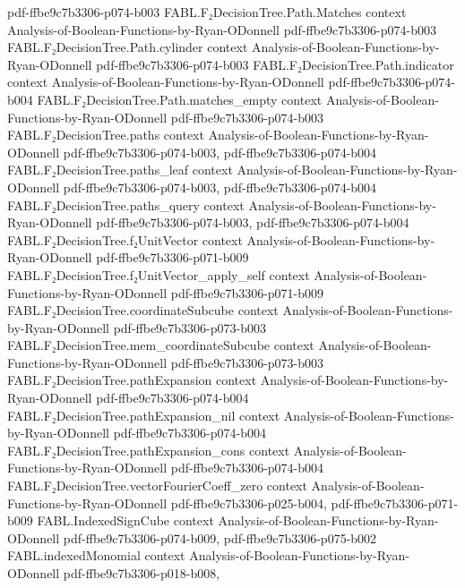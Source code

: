 \begin{theorem}
  {pdf-ffbe9c7b3306-p074-b003}
\proofstep
  {FABL.F₂DecisionTree.Path.Matches}
  {context}
  {Analysis-of-Boolean-Functions-by-Ryan-ODonnell}
  {pdf-ffbe9c7b3306-p074-b003}
\proofstep
  {FABL.F₂DecisionTree.Path.cylinder}
  {context}
  {Analysis-of-Boolean-Functions-by-Ryan-ODonnell}
  {pdf-ffbe9c7b3306-p074-b003}
\proofstep
  {FABL.F₂DecisionTree.Path.indicator}
  {context}
  {Analysis-of-Boolean-Functions-by-Ryan-ODonnell}
  {pdf-ffbe9c7b3306-p074-b004}
\proofstep
  {FABL.F₂DecisionTree.Path.matches_empty}
  {context}
  {Analysis-of-Boolean-Functions-by-Ryan-ODonnell}
  {pdf-ffbe9c7b3306-p074-b003}
\proofstep
  {FABL.F₂DecisionTree.paths}
  {context}
  {Analysis-of-Boolean-Functions-by-Ryan-ODonnell}
  {pdf-ffbe9c7b3306-p074-b003,
    pdf-ffbe9c7b3306-p074-b004}
\proofstep
  {FABL.F₂DecisionTree.paths_leaf}
  {context}
  {Analysis-of-Boolean-Functions-by-Ryan-ODonnell}
  {pdf-ffbe9c7b3306-p074-b003,
    pdf-ffbe9c7b3306-p074-b004}
\proofstep
  {FABL.F₂DecisionTree.paths_query}
  {context}
  {Analysis-of-Boolean-Functions-by-Ryan-ODonnell}
  {pdf-ffbe9c7b3306-p074-b003,
    pdf-ffbe9c7b3306-p074-b004}
\proofstep
  {FABL.F₂DecisionTree.f₂UnitVector}
  {context}
  {Analysis-of-Boolean-Functions-by-Ryan-ODonnell}
  {pdf-ffbe9c7b3306-p071-b009}
\proofstep
  {FABL.F₂DecisionTree.f₂UnitVector_apply_self}
  {context}
  {Analysis-of-Boolean-Functions-by-Ryan-ODonnell}
  {pdf-ffbe9c7b3306-p071-b009}
\proofstep
  {FABL.F₂DecisionTree.coordinateSubcube}
  {context}
  {Analysis-of-Boolean-Functions-by-Ryan-ODonnell}
  {pdf-ffbe9c7b3306-p073-b003}
\proofstep
  {FABL.F₂DecisionTree.mem_coordinateSubcube}
  {context}
  {Analysis-of-Boolean-Functions-by-Ryan-ODonnell}
  {pdf-ffbe9c7b3306-p073-b003}
\proofstep
  {FABL.F₂DecisionTree.pathExpansion}
  {context}
  {Analysis-of-Boolean-Functions-by-Ryan-ODonnell}
  {pdf-ffbe9c7b3306-p074-b004}
\proofstep
  {FABL.F₂DecisionTree.pathExpansion_nil}
  {context}
  {Analysis-of-Boolean-Functions-by-Ryan-ODonnell}
  {pdf-ffbe9c7b3306-p074-b004}
\proofstep
  {FABL.F₂DecisionTree.pathExpansion_cons}
  {context}
  {Analysis-of-Boolean-Functions-by-Ryan-ODonnell}
  {pdf-ffbe9c7b3306-p074-b004}
\proofstep
  {FABL.F₂DecisionTree.vectorFourierCoeff_zero}
  {context}
  {Analysis-of-Boolean-Functions-by-Ryan-ODonnell}
  {pdf-ffbe9c7b3306-p025-b004,
    pdf-ffbe9c7b3306-p071-b009}
\proofstep
  {FABL.IndexedSignCube}
  {context}
  {Analysis-of-Boolean-Functions-by-Ryan-ODonnell}
  {pdf-ffbe9c7b3306-p074-b009,
    pdf-ffbe9c7b3306-p075-b002}
\proofstep
  {FABL.indexedMonomial}
  {context}
  {Analysis-of-Boolean-Functions-by-Ryan-ODonnell}
  {pdf-ffbe9c7b3306-p018-b008,
}
\end{theorem}
